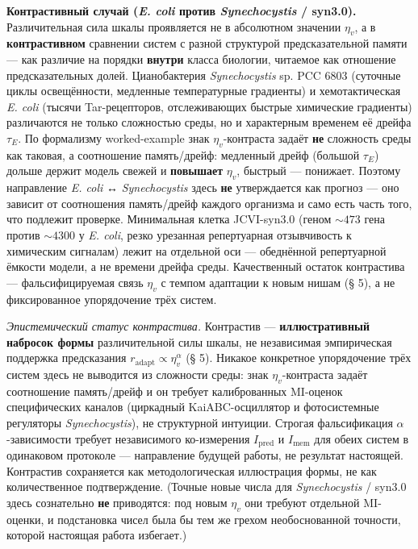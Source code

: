 \documentclass[pdflatex,sn-mathphys-ay]{sn-jnl}
\begin{document}
\textbf{Контрастивный случай (\emph{E. coli} против \emph{Synechocystis} / syn3.0).} Различительная сила шкалы проявляется не в абсолютном значении \(\eta_v\), а в \textbf{контрастивном} сравнении систем с разной структурой предсказательной памяти --- как различие на порядки \textbf{внутри} класса биологии, читаемое как отношение предсказательных долей. Цианобактерия \emph{Synechocystis} sp. PCC 6803 (суточные циклы освещённости, медленные температурные градиенты) и хемотактическая \emph{E. coli} (тысячи Tar-рецепторов, отслеживающих быстрые химические градиенты) различаются не только сложностью среды, но и характерным временем её дрейфа \(\tau_E\). По формализму worked-example знак \(\eta_v\)-контраста задаёт \textbf{не} сложность среды как таковая, а соотношение память/дрейф: медленный дрейф (большой \(\tau_E\)) дольше держит модель свежей и \textbf{повышает} \(\eta_v\), быстрый --- понижает. Поэтому направление \emph{E. coli} ↔ \emph{Synechocystis} здесь \textbf{не} утверждается как прогноз --- оно зависит от соотношения память/дрейф каждого организма и само есть часть того, что подлежит проверке. Минимальная клетка JCVI-syn3.0 (геном \(\sim 473\) гена против \(\sim 4300\) у \emph{E. coli}, резко урезанная репертуарная отзывчивость к химическим сигналам) лежит на отдельной оси --- обеднённой репертуарной ёмкости модели, а не времени дрейфа среды. Качественный остаток контрастива --- фальсифицируемая связь \(\eta_v\) с темпом адаптации к новым нишам (§ 5), а не фиксированное упорядочение трёх систем.

\emph{Эпистемический статус контрастива.} Контрастив --- \textbf{иллюстративный набросок формы} различительной силы шкалы, не независимая эмпирическая поддержка предсказания \(r_{\text{adapt}} \propto \eta_v^{\alpha}\) (§ 5). Никакое конкретное упорядочение трёх систем здесь не выводится из сложности среды: знак \(\eta_v\)-контраста задаёт соотношение память/дрейф и он требует калиброванных MI-оценок специфических каналов (циркадный KaiABC-осциллятор и фотосистемные регуляторы \emph{Synechocystis}), не структурной интуиции. Строгая фальсификация \(\alpha\)-зависимости требует независимого ко-измерения \(I_{\text{pred}}\) и \(I_{\text{mem}}\) для обеих систем в одинаковом протоколе --- направление будущей работы, не результат настоящей. Контрастив сохраняется как методологическая иллюстрация формы, не как количественное подтверждение. (Точные новые числа для \emph{Synechocystis} / syn3.0 здесь сознательно \textbf{не} приводятся: под новым \(\eta_v\) они требуют отдельной MI-оценки, и подстановка чисел была бы тем же грехом необоснованной точности, которой настоящая работа избегает.)
\end{document}
